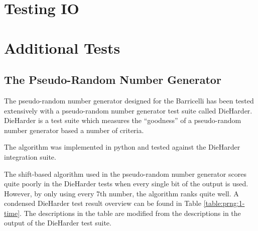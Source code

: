 \section{Testing IO}


\section{Additional Tests}

\subsection{The Pseudo-Random Number Generator}


The pseudo-random number generator designed for the Barricelli has been tested extensively with a pseudo-random number generator test suite called DieHarder\cn.
DieHarder is a test suite which measures the ``goodness'' of a pseudo-random number generator based a number of criteria.

The algorithm was implemented in python and tested against the DieHarder integration suite\cn.

The shift-based algorithm used in the pseudo-random number generator scores quite poorly in the DieHarder tests when every single bit of the output is used.
However, by only using every 7th number\cn, the algorithm ranks quite well.
A condensed DieHarder test result overview can be found in Table \vref{table:prng:1-time}.
The descriptions in the table are modified from the descriptions in the output of the DieHarder test suite.

